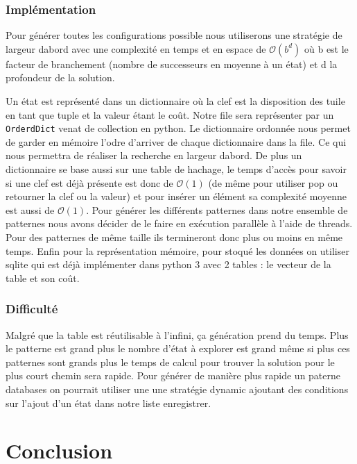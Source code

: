 \documentclass[a4paper, 12pt]{article}
\begin{document}
\subsubsection{Implémentation}
Pour générer toutes les configurations possible nous utiliserons une stratégie de largeur dabord avec une complexité en temps et en espace de $\mathcal{O}(b^{d})$ où b est le facteur de branchement (nombre de successeurs en moyenne à un état) et d la profondeur de la solution.

Un état est représenté dans un dictionnaire où la clef est la disposition des tuile en tant que tuple et la valeur étant le coût. Notre file sera représenter par un \lstinline{OrderdDict} venat de collection en python. Le dictionnaire ordonnée nous permet de garder en mémoire l'odre d'arriver de chaque dictionnaire dans la file. Ce qui nous permettra de réaliser la recherche en largeur dabord. De plus un dictionnaire se base aussi sur une table de hachage, le temps d'accès pour savoir si une clef est déjà présente est donc de $\mathcal{O}(1)$ (de même pour utiliser pop ou retourner la clef ou la valeur) et pour insérer un élément sa complexité moyenne est aussi de $\mathcal{O}(1)$.
Pour générer les différents patternes dans notre ensemble de patternes nous avons décider de le faire en exécution parallèle à l'aide de threads. Pour des patternes de même taille ils termineront donc plus ou moins en même temps.
Enfin pour la représentation mémoire, pour stoqué les données on utiliser sqlite qui est déjà implémenter dans python 3 avec 2 tables : le vecteur de la table et son coût.
\subsubsection{Difficulté}
Malgré que la table est réutilisable à l'infini, ça génération prend du temps. Plus le patterne est grand plus le nombre d'état à explorer est grand même si plus ces patternes sont grands plus le temps de calcul pour trouver la solution pour le plus court chemin sera rapide. Pour générer de manière plus rapide un paterne databases on pourrait utiliser une une stratégie dynamic ajoutant des conditions sur l'ajout d'un état dans notre liste enregistrer.

\section{Conclusion}
\end{document}
